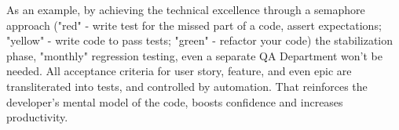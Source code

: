 As an example, by achieving the technical excellence through a semaphore approach ("red" - write test for the missed 
part of a code, assert expectations; "yellow" - write code to pass tests; "green" - refactor your code) the 
stabilization phase, "monthly" regression testing, even a separate QA Department won't be needed. All acceptance 
criteria for user story, feature, and even epic are transliterated into tests, and controlled by automation. That 
reinforces the developer's mental model of the code, boosts confidence and increases productivity.
